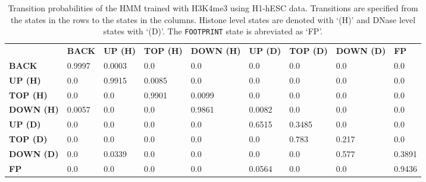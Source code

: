 \documentclass{bioinfo}
\begin{document}
\begin{table}[t]
\begin{center}
\caption{Transition probabilities of the HMM trained with H3K4me3 using H1-hESC data. Transitions are specified from the states in the rows to the states in the columns. Histone level states are denoted with `(H)' and DNase level states with `(D)'. The {\tt FOOTPRINT} state is abreviated as `FP'.}
\label{tab:hmmtrans}
    \renewcommand{\arraystretch}{1.2}
    \begin{tabular}{ lllllllll }
        \hline
        & \textbf{BACK} & \textbf{UP (H)} & \textbf{TOP (H)} & \textbf{DOWN (H)} & \textbf{UP (D)}
        & \textbf{TOP (D)} & \textbf{DOWN (D)} & \textbf{FP} \\
        \textbf{BACK}     & 0.9997 & 0.0003 & 0.0    & 0.0    & 0.0    & 0.0    & 0.0   & 0.0    \\
        \textbf{UP (H)}   & 0.0    & 0.9915 & 0.0085 & 0.0    & 0.0    & 0.0    & 0.0   & 0.0    \\
        \textbf{TOP (H)}  & 0.0    & 0.0    & 0.9901 & 0.0099 & 0.0    & 0.0    & 0.0   & 0.0    \\
        \textbf{DOWN (H)} & 0.0057 & 0.0    & 0.0    & 0.9861 & 0.0082 & 0.0    & 0.0   & 0.0    \\
        \textbf{UP (D)}   & 0.0    & 0.0    & 0.0    & 0.0    & 0.6515 & 0.3485 & 0.0   & 0.0    \\
        \textbf{TOP (D)}  & 0.0    & 0.0    & 0.0    & 0.0    & 0.0    & 0.783  & 0.217 & 0.0    \\
        \textbf{DOWN (D)} & 0.0    & 0.0339 & 0.0    & 0.0    & 0.0    & 0.0    & 0.577 & 0.3891 \\
        \textbf{FP}       & 0.0    & 0.0    & 0.0    & 0.0    & 0.0564 & 0.0    & 0.0   & 0.9436 \\
        \hline
    \end{tabular}
\end{center}
\end{table}
\end{document}

